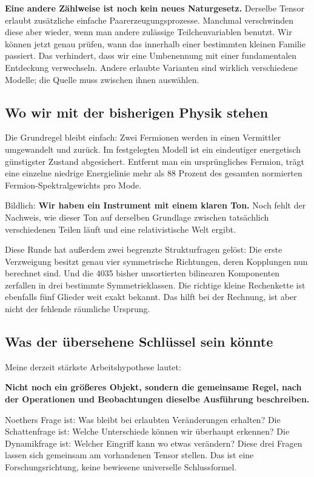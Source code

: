 \documentclass[
  ngerman,
  10pt,
  a4paper,
]{article}
\begin{document}
\textbf{Eine andere Zählweise ist noch kein neues Naturgesetz.} Derselbe
Tensor erlaubt zusätzliche einfache Paarerzeugungsprozesse. Manchmal
verschwinden diese aber wieder, wenn man andere zulässige
Teilchenvariablen benutzt. Wir können jetzt genau prüfen, wann das
innerhalb einer bestimmten kleinen Familie passiert. Das verhindert,
dass wir eine Umbenennung mit einer fundamentalen Entdeckung
verwechseln. Andere erlaubte Varianten sind wirklich verschiedene
Modelle; die Quelle muss zwischen ihnen auswählen.

\subsection{Wo wir mit der bisherigen Physik
stehen}\label{wo-wir-mit-der-bisherigen-physik-stehen}

Die Grundregel bleibt einfach: Zwei Fermionen werden in einen Vermittler
umgewandelt und zurück. Im festgelegten Modell ist ein eindeutiger
energetisch günstigster Zustand abgesichert. Entfernt man ein
ursprüngliches Fermion, trägt eine einzelne niedrige Energielinie mehr
als 88 Prozent des gesamten normierten Fermion-Spektralgewichts pro
Mode.

Bildlich: \textbf{Wir haben ein Instrument mit einem klaren Ton.} Noch
fehlt der Nachweis, wie dieser Ton auf derselben Grundlage zwischen
tatsächlich verschiedenen Teilen läuft und eine relativistische Welt
ergibt.

Diese Runde hat außerdem zwei begrenzte Strukturfragen gelöst: Die erste
Verzweigung besitzt genau vier symmetrische Richtungen, deren Kopplungen
nun berechnet sind. Und die 4035 bisher unsortierten bilinearen
Komponenten zerfallen in drei bestimmte Symmetrieklassen. Die richtige
kleine Rechenkette ist ebenfalls fünf Glieder weit exakt bekannt. Das
hilft bei der Rechnung, ist aber nicht der fehlende räumliche Ursprung.

\subsection{Was der übersehene Schlüssel sein
könnte}\label{was-der-uxfcbersehene-schluxfcssel-sein-kuxf6nnte}

Meine derzeit stärkste Arbeitshypothese lautet:

\textbf{Nicht noch ein größeres Objekt, sondern die gemeinsame Regel,
nach der Operationen und Beobachtungen dieselbe Ausführung beschreiben.}

Noethers Frage ist: Was bleibt bei erlaubten Veränderungen erhalten? Die
Schattenfrage ist: Welche Unterschiede können wir überhaupt erkennen?
Die Dynamikfrage ist: Welcher Eingriff kann wo etwas verändern? Diese
drei Fragen lassen sich gemeinsam am vorhandenen Tensor stellen. Das ist
eine Forschungsrichtung, keine bewiesene universelle Schlussformel.
\end{document}
